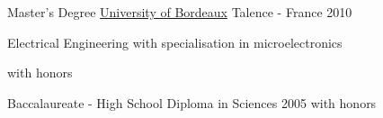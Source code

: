 \begin{cventries}
  \cventry
    {Master's Degree} %
    {\href{https://www.u-bordeaux.fr}{University of Bordeaux}} %
    {Talence - France} %
    {2010} %
    {
      \begin{cvitems} %
        \item {Electrical Engineering with specialisation in microelectronics}
        \item {with honors}
      \end{cvitems}
    }

  \cventry
    {Baccalaureate - High School Diploma in Sciences} %
    {} %
    {} %
    {2005} %
    {
      with honors
    }
\end{cventries}
